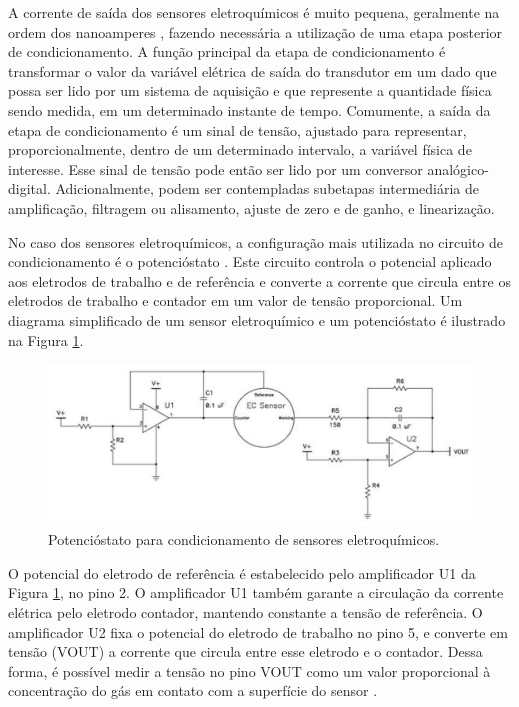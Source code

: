 A corrente de saída dos sensores eletroquímicos é muito pequena, geralmente na ordem dos nanoamperes \cite{R.Stetter2008AmperometricReview}, fazendo necessária a utilização de uma etapa posterior de condicionamento. A função principal da etapa de condicionamento é transformar o valor da variável elétrica de saída do transdutor em um dado que possa ser lido por um sistema de aquisição e que represente a quantidade física sendo medida, em um determinado instante de tempo. Comumente, a saída da etapa de condicionamento é um sinal de tensão, ajustado para representar, proporcionalmente, dentro de um determinado intervalo, a variável física de interesse. Esse sinal de tensão pode então ser lido por um conversor analógico-digital. Adicionalmente, podem ser contempladas subetapas intermediária de amplificação, filtragem ou alisamento, ajuste de zero e de ganho, e linearização. 

No caso dos sensores eletroquímicos, a configuração mais utilizada no circuito de condicionamento é o potencióstato \cite{Alphasense2013AlphasenseWork,SPECSensors2016SPECConsiderations}. Este circuito controla o potencial aplicado aos eletrodos de trabalho e de referência e converte a corrente que circula entre os eletrodos de trabalho e contador em um valor de tensão proporcional. Um diagrama simplificado de um sensor eletroquímico e um potencióstato é ilustrado na Figura \ref{fig:condic-ec}.

\begin{figure}[htb]
	\caption{\label{fig:condic-ec}Potencióstato para condicionamento de sensores eletroquímicos.}
	\begin{center}
		\includegraphics[width=\textwidth]{aftertext/Operação sensores/Figuras/Condicionamento SPEC.PNG}
	\end{center}
\end{figure}

O potencial do eletrodo de referência é estabelecido pelo amplificador U1 da Figura \ref{fig:condic-ec}, no pino 2. O amplificador U1 também garante a circulação da corrente elétrica pelo eletrodo contador, mantendo constante a tensão de referência. O amplificador U2 fixa o potencial do eletrodo de trabalho no pino 5, e converte em tensão (VOUT) a corrente que circula entre esse eletrodo e o contador. Dessa forma, é possível medir a tensão no pino VOUT como um valor proporcional à concentração do gás em contato com a superfície do sensor \cite{SPECSensors2016SPECConsiderations}.